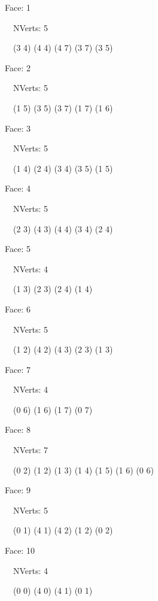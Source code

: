 \documentclass{article}
\begin{document}
{\footnotesize 

Face: 1

\   \    NVerts: 5

 \   \   (3 4) (4 4) (4 7) (3 7) (3 5)}

{\footnotesize 

Face: 2

\   \    NVerts: 5

 \   \   (1 5) (3 5) (3 7) (1 7) (1 6)}

{\footnotesize 

Face: 3

\   \    NVerts: 5

 \   \   (1 4) (2 4) (3 4) (3 5) (1 5)}

{\footnotesize 

Face: 4

\   \    NVerts: 5

 \   \   (2 3) (4 3) (4 4) (3 4) (2 4)}

{\footnotesize 

Face: 5

\   \    NVerts: 4

 \   \   (1 3) (2 3) (2 4) (1 4)}

{\footnotesize 

Face: 6

\   \    NVerts: 5

 \   \   (1 2) (4 2) (4 3) (2 3) (1 3)}

{\footnotesize 

Face: 7

\   \    NVerts: 4

 \   \   (0 6) (1 6) (1 7) (0 7)}

{\footnotesize 

Face: 8

\   \    NVerts: 7

 \   \   (0 2) (1 2) (1 3) (1 4) (1 5) (1 6) (0 6)}

{\footnotesize 

Face: 9

\   \    NVerts: 5

 \   \   (0 1) (4 1) (4 2) (1 2) (0 2)}

{\footnotesize 

Face: 10

\   \    NVerts: 4

 \   \   (0 0) (4 0) (4 1) (0 1)}


 \newpage
\end{document}
